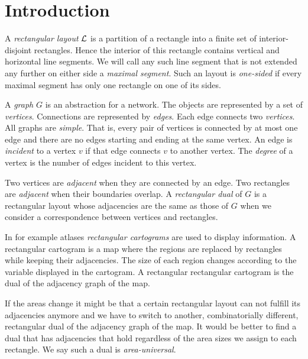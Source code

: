 



\section{Introduction}

A  \emph{rectangular layout} $\mathcal{L}$ is a partition of a rectangle into a finite set of interior-disjoint rectangles. Hence the interior of this rectangle contains vertical and horizontal line segments. We will call any such line segment that is not extended any further on either side a \emph{maximal segment}. Such an layout is \emph{one-sided} if every maximal segment has only one rectangle on one of its sides.

A \emph{graph} $G$ is an abstraction for a network. The objects are represented by a set of \emph{vertices}. Connections are represented by \emph{edges}. Each edge connects two \emph{vertices}. All graphs are \emph{simple}. That is, every pair of vertices is connected by at most one edge and there are no edges starting and ending at the same vertex. An edge is \emph{incident} to a vertex $v$ if that edge connects $v$ to another vertex. The \emph{degree} of a vertex is the number of edges incident to this vertex.

Two vertices are \emph{adjacent} when they are connected by an edge. Two rectangles are \emph{adjacent} when their boundaries overlap. A \emph{rectangular dual} of $G$ is a rectangular layout whose adjacencies are the same as those of $G$ when we consider a correspondence between vertices and rectangles.

In for example atlases \emph{rectangular cartograms} are used to display information. A rectangular cartogram is a map where the regions are replaced by rectangles while keeping their adjacencies. The size of each region changes according to the variable displayed in the cartogram.  A rectangular rectangular cartogram is the dual of the adjacency graph of the map.

If the areas change it might be that a certain rectangular layout can not fulfill its adjacencies anymore and we have to switch to another, combinatorially different, rectangular dual of the adjacency graph of the map. It would be better to find a dual that has adjacencies that hold regardless of the area sizes we assign to each rectangle. We say such a dual is  \emph{area-universal}.

